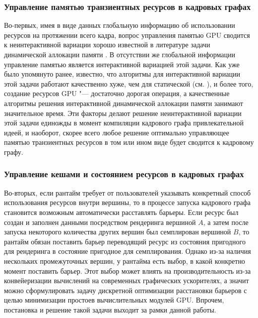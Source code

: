 \subsubsection{Управление памятью транзиентных ресурсов в кадровых графах}
Во-первых, имея в виде данных глобальную информацию об использовании ресурсов на протяжении всего кадра, вопрос управления памятью GPU сводится к неинтерактивной вариации хорошо известной в литературе задачи динамической аллокации памяти \cite[с. 226]{10.5555/574848}.
В отсутствии же глобальной информации управление памятью является интерактивной вариацией этой задачи.
Как уже было упомянуто ранее, известно, что алгоритмы для интерактивной вариации этой задачи работают качественно хуже, чем для статической (см. \cite{robson1971estimate}), и более того, создание ресурсов GPU "--- достаточно дорогая операция, а качественные алгоритмы решения интерактивной динамической аллокации памяти занимают значительное время.
Эти факторы делают решение неинтерактивной вариации этой задачи единожды в момент компиляции кадрового графа привлекательной идеей, и наоборот, скорее всего любое решение оптимально управляющее памятью транзиентных ресурсов в том или ином виде будет сводится к кадровому графу.

\subsubsection{Управление кешами и состоянием ресурсов в кадровых графах}
Во-вторых, если рантайм требует от пользователей указывать конкретный способ использования ресурсов внутри вершины, то в процессе запуска кадрового графа становится возможным автоматически расставлять барьеры.
Если ресурс был создан и заполнен данными посредством рендеринга вершиной $A$, а затем после запуска некоторого количества других вершин был семплирован вершиной $B$, то рантайм обязан поставить барьер переводящий ресурс из состояния пригодного для рендеринга в состояние пригодное для семплирования.
Однако из-за наличия нескольких промежуточных вершин, у рантайма есть выбор, в какой конкретно момент поставить барьер.
Этот выбор может влиять на производительность из-за конвейеризации вычислений на современных графических ускорителях, а значит можно сформулировать задачу дискретной оптимизации расстановки барьеров с целью минимизации простоев вычислительных модулей GPU.
Впрочем, постановка и решение такой задачи выходит за рамки данной работы.

